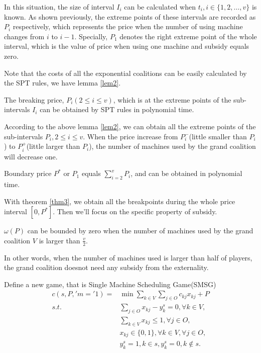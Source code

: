 In this situation, the size of interval $I_i$ can be calculated when $t_i,i \in \{1,2,\ldots,v\}$ is known. As shown previously, the extreme points of these intervals are recorded as $P_i$ respectively, which represents the price when the number of using machine changes from $i$ to $i-1$. Specially, $P_1$ denotes the right extreme point of the whole interval, which is the value of price when using one machine and subsidy equals zero.

Note that the costs of all the exponential coalitions can be easily calculated by the SPT rules, we have lemma \ref{lem2}.

\begin{lem}\label{lem2}
The breaking price, $P_i(2 \leq i \leq v)$, which is at the extreme points of the sub-intervals $I_i$ can be obtained by SPT rules in polynomial time.
\end{lem}

According to the above lemma \ref{lem2}, we can obtain all the extreme points of the sub-intervals $P_i, 2 \leq i \leq v$. When the price increase from $P_i^-$(little smaller than $P_i$) to $P_i^+$(little larger than $P_i$), the number of machines used by the grand coalition will decrease one.

\begin{thm}\label{thm3}
Boundary price $P^*$ or $P_1$ equals $\sum_{i=2}^v P_i$, and can be obtained in polynomial time.
\end{thm}

With theorem \ref{thm3}, we obtain all the breakpoints during the whole price interval $[0,P^*]$. Then we'll focus on the specific property of subsidy.

\begin{thm}\label{thm4}
$\omega(P)$ can be bounded by zero when the number of machines used by the grand coalition $V$ is larger than $\frac{v}{2}$.
\end{thm}

In other words, when the number of machines used is larger than half of players, the grand coalition doesnot need any subsidy from the externality.

Define a new game, that is Single Machine Scheduling Game(SMSG)
\[
\begin{aligned}
c(s,P,'m='1) = & {\min} \sum_{k\in V}\sum_{j\in O} {c_{kj} x_{kj} + P} \\
{s.t.}\quad & \sum_{j \in O} x_{kj}-y_k^s=0, \forall k \in V, \\
& \sum_{k\in V} x_{kj} \leq 1, \forall j \in O,  \\
& x_{kj} \in \{0,1\} , \forall k \in V, \forall j \in O,\\
& y_k^s=1, k \in s, y_k^s=0, k \notin s.
\end{aligned}
\]

